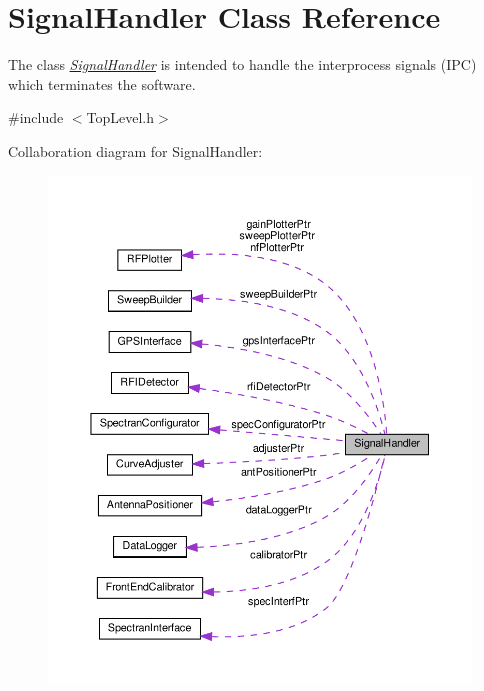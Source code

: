\hypertarget{classSignalHandler}{}\section{Signal\+Handler Class Reference}
\label{classSignalHandler}


The class {\itshape \hyperlink{classSignalHandler}{Signal\+Handler}} is intended to handle the interprocess signals (I\+PC) which terminates the software.  




{\ttfamily \#include $<$Top\+Level.\+h$>$}



Collaboration diagram for Signal\+Handler\+:
\nopagebreak
\begin{figure}[H]
\begin{center}
\leavevmode
\includegraphics[width=350pt]{classSignalHandler__coll__graph}
\end{center}
\end{figure}
